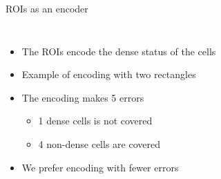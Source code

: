 \documentclass[10pt]{beamer}
\begin{document}
\begin{frame}{ROIs as an encoder}

\begin{columns}[T, onlytextwidth]
    \begin{itemize}
        \item <1->The ROIs encode the dense status of the cells
        \item <1->Example of encoding with two rectangles
        \item <2-> The encoding makes 5 errors
        \begin{itemize}
            \item <3->1 dense cells is not covered
            \item <4->4 non-dense cells are covered
        \end{itemize}
        \item <5-> We prefer encoding with fewer errors
    \end{itemize}
    

\end{columns}
\end{frame}
\end{document}
